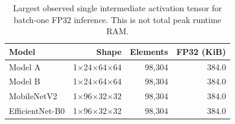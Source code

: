 \begin{table}[t]
\centering\small
\caption{Largest observed single intermediate activation tensor for batch-one FP32 inference. This is not total peak runtime RAM.}
\label{tab:activation-memory}
\begin{tabular}{lrrr}\toprule
Model & Shape & Elements & FP32 (KiB)\\\midrule
Model A & 1$\times$24$\times$64$\times$64 & 98,304 & 384.0\\
Model B & 1$\times$24$\times$64$\times$64 & 98,304 & 384.0\\
MobileNetV2 & 1$\times$96$\times$32$\times$32 & 98,304 & 384.0\\
EfficientNet-B0 & 1$\times$96$\times$32$\times$32 & 98,304 & 384.0\\
\bottomrule\end{tabular}
\end{table}
